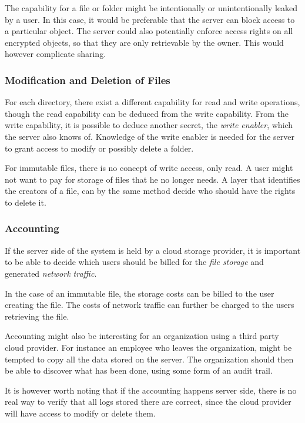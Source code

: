 \documentclass[pdftex,english,10pt,b5paper,twoside]{book}
\begin{document}
The capability for a file or folder might be intentionally or unintentionally
leaked by a user. In this case, it would be preferable that the server can
block access to a particular object. The server could also potentially enforce
access rights on all encrypted objects, so that they are only retrievable by
the owner. This would however complicate sharing. 

\subsubsection{Modification and Deletion of Files}

For each directory, there exist a different capability for read and write
operations, though the read capability can be deduced from the write
capability. From the write capability, it is possible to deduce another secret,
the \emph{write enabler}, which the server also knows of.  Knowledge of the
write enabler is needed for the server to grant access to modify or possibly
delete a folder.

For immutable files, there is no concept of write access, only read. A user
might not want to pay for storage of files that he no longer needs.  A layer
that identifies the creators of a file, can by the same method decide who
should have the rights to delete it.

\subsubsection{Accounting}

If the server side of the system is held by a cloud storage provider, it is
important to be able to decide which users should be billed for the \emph{file
storage} and generated \emph{network traffic}.

In the case of an immutable file, the storage costs can be billed to the user
creating the file. The costs of network traffic can further be charged to the
users retrieving the file.

Accounting might also be interesting for an organization using a third party
cloud provider. For instance an employee who leaves the organization, might be
tempted to copy all the data stored on the server. The organization should then
be able to discover what has been done, using some form of an audit trail.

It is however worth noting that if the accounting happens server side, there is
no real way to verify that all logs stored there are correct, since the cloud
provider will have access to modify or delete them.
\end{document}
